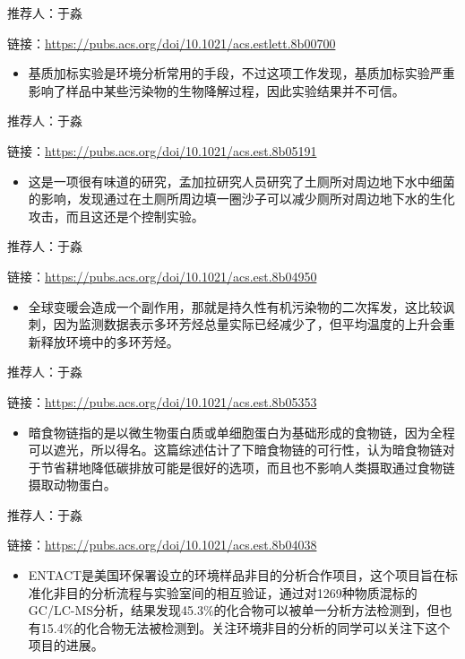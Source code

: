 \documentclass[
]{book}
\providecommand{\tightlist}{%
  \setlength{\itemsep}{0pt}\setlength{\parskip}{0pt}}
\begin{document}
推荐人：于淼

链接：\url{https://pubs.acs.org/doi/10.1021/acs.estlett.8b00700}

\begin{itemize}
\tightlist
\item
  基质加标实验是环境分析常用的手段，不过这项工作发现，基质加标实验严重影响了样品中某些污染物的生物降解过程，因此实验结果并不可信。
\end{itemize}

推荐人：于淼

链接：\url{https://pubs.acs.org/doi/10.1021/acs.est.8b05191}

\begin{itemize}
\tightlist
\item
  这是一项很有味道的研究，孟加拉研究人员研究了土厕所对周边地下水中细菌的影响，发现通过在土厕所周边填一圈沙子可以减少厕所对周边地下水的生化攻击，而且这还是个控制实验。
\end{itemize}

推荐人：于淼

链接：\url{https://pubs.acs.org/doi/10.1021/acs.est.8b04950}

\begin{itemize}
\tightlist
\item
  全球变暖会造成一个副作用，那就是持久性有机污染物的二次挥发，这比较讽刺，因为监测数据表示多环芳烃总量实际已经减少了，但平均温度的上升会重新释放环境中的多环芳烃。
\end{itemize}

推荐人：于淼

链接：\url{https://pubs.acs.org/doi/10.1021/acs.est.8b05353}

\begin{itemize}
\tightlist
\item
  暗食物链指的是以微生物蛋白质或单细胞蛋白为基础形成的食物链，因为全程可以遮光，所以得名。这篇综述估计了下暗食物链的可行性，认为暗食物链对于节省耕地降低碳排放可能是很好的选项，而且也不影响人类摄取通过食物链摄取动物蛋白。
\end{itemize}

推荐人：于淼

链接：\url{https://pubs.acs.org/doi/10.1021/acs.est.8b04038}

\begin{itemize}
\tightlist
\item
  ENTACT是美国环保署设立的环境样品非目的分析合作项目，这个项目旨在标准化非目的分析流程与实验室间的相互验证，通过对1269种物质混标的GC/LC-MS分析，结果发现45.3\%的化合物可以被单一分析方法检测到，但也有15.4\%的化合物无法被检测到。关注环境非目的分析的同学可以关注下这个项目的进展。
\end{itemize}
\end{document}
